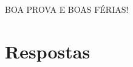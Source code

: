\documentclass[12pt,a4paper]{article}
\begin{document}
\begin{center}
BOA PROVA E BOAS FÉRIAS!
\end{center}

\newpage
\restoregeometry
\section*{Respostas}
\shipoutAnswer
\end{document}
